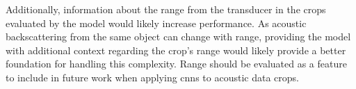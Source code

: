     
    
    


    Additionally, information about the range from the transducer in the crops evaluated by the model would likely increase performance. As acoustic backscattering from the same object can change with range, providing the model with additional context regarding the crop's range would likely provide a better foundation for handling this complexity. Range should be evaluated as a feature to include in future work when applying \gls{cnn}s to acoustic data crops. 

